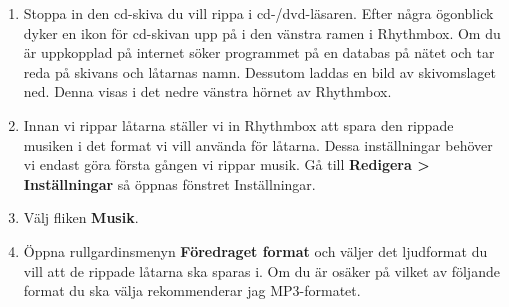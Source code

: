 \documentclass[a4paper,final]{memoir} %
\begin{document}
\begin{enumerate}

\item Stoppa in den cd-skiva du vill rippa i cd-/dvd-läsaren. Efter några ögonblick dyker en ikon för cd-skivan upp på i den vänstra ramen i Rhythmbox.  Om du är uppkopplad på internet söker programmet på en databas på nätet och tar reda på skivans och låtarnas namn. Dessutom laddas en bild av skivomslaget ned. Denna visas i det nedre vänstra hörnet av Rhythmbox.


\item Innan vi rippar låtarna ställer vi in Rhythmbox att spara den rippade musiken i det format vi vill använda för låtarna. Dessa inställningar behöver vi endast göra första gången vi rippar musik. Gå till \textbf{Redigera \textgreater{} Inställningar} så öppnas fönstret Inställningar.

\item Välj fliken \textbf{Musik}.

\item Öppna rullgardinsmenyn \textbf{Föredraget format} och väljer det ljudformat du vill att de rippade låtarna ska sparas i. Om du är osäker på vilket av följande format du ska välja rekommenderar jag MP3-formatet. 


\xnegskip{} 

\begin{itemize}




\end{itemize}
\end{enumerate}
\end{document}

